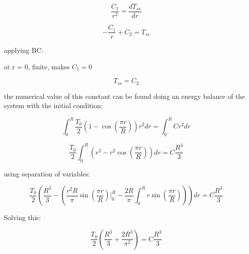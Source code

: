 \documentclass[12pt,letterpaper]{article}
\begin{document}
\[\frac{C_1}{r^2} = \frac{dT_{ss}}{dr}\]

\[-\frac{C_1}{r} + C_2 = T_{ss}\]

applying BC:

at r = 0, finite, makes  $C_1 = 0$

\[T_{ss} = C_2\]

the numerical value of this constant can be found doing an energy balance
of the system with the initial condition:

\[\int_{0}^{R} \frac{T_0}{2} (1-\cos(\frac{\pi r}{R})) r^2 dr = \int_{0}^{R} C r^2 dr \]

\[\frac{T_0}{2} \int_{0}^{R}  (r^2-r^2\cos(\frac{\pi r}{R})) dr = C \frac{R^3}{3} \]

using separation of variables:

\[\frac{T_0}{2} ( \frac{R^3}{3} - (\frac{r^2 R}{\pi} \sin(\frac{\pi r}{R})\Big|_0^R - \frac{2R}{\pi} \int_0^R r \sin(\frac{\pi r}{R})))dr = C \frac{R^3}{3}\]

Solving this:

\[\frac{T_0}{2} (\frac{R^3}{3} + \frac{2R^3}{\pi ^2}) = C \frac{R^3}{3} \]
\end{document}
